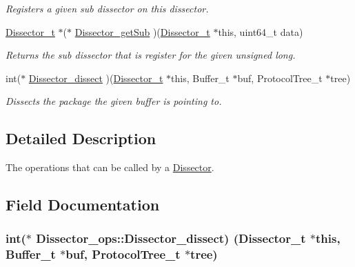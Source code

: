 \begin{DoxyCompactItemize}
\begin{DoxyCompactList}\small\item\em Registers a given sub dissector on this dissector. \end{DoxyCompactList}\item 
\hyperlink{struct_dissector}{Dissector\+\_\+t} $\ast$($\ast$ \hyperlink{struct_dissector__ops_a75d23262c0f9f303cc6dfb18446f4265}{Dissector\+\_\+get\+Sub} )(\hyperlink{struct_dissector}{Dissector\+\_\+t} $\ast$this, uint64\+\_\+t data)
\begin{DoxyCompactList}\small\item\em Returns the sub dissector that is register for the given unsigned long. \end{DoxyCompactList}\item 
int($\ast$ \hyperlink{struct_dissector__ops_a6dcacad56d3939148ddd7bca89b7c72b}{Dissector\+\_\+dissect} )(\hyperlink{struct_dissector}{Dissector\+\_\+t} $\ast$this, Buffer\+\_\+t $\ast$buf, Protocol\+Tree\+\_\+t $\ast$tree)
\begin{DoxyCompactList}\small\item\em Dissects the package the given buffer is pointing to. \end{DoxyCompactList}\end{DoxyCompactItemize}


\subsection{Detailed Description}
The operations that can be called by a \hyperlink{struct_dissector}{Dissector}. 

\subsection{Field Documentation}
\hypertarget{struct_dissector__ops_a6dcacad56d3939148ddd7bca89b7c72b}{}
\subsubsection[{Dissector\+\_\+dissect}]{\setlength{\rightskip}{0pt plus 5cm}int($\ast$ Dissector\+\_\+ops\+::\+Dissector\+\_\+dissect) ({\bf Dissector\+\_\+t} $\ast$this, Buffer\+\_\+t $\ast$buf, Protocol\+Tree\+\_\+t $\ast$tree)}\label{struct_dissector__ops_a6dcacad56d3939148ddd7bca89b7c72b}


